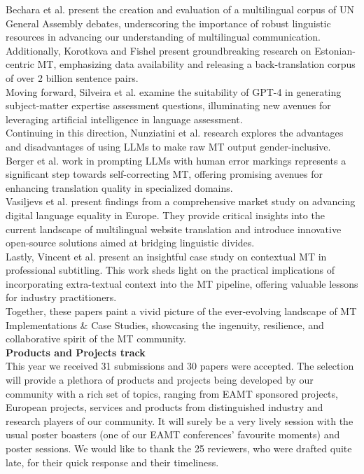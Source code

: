 Bechara et al. present the creation and evaluation of a multilingual corpus of UN General Assembly debates, underscoring the importance of robust linguistic resources in advancing our understanding of multilingual communication.
\\

Additionally, Korotkova and Fishel present groundbreaking research on Estonian-centric MT, emphasizing data availability and releasing a back-translation corpus of over 2 billion sentence pairs.
\\

Moving forward, Silveira et al. examine the suitability of GPT-4 in generating subject-matter expertise assessment questions, illuminating new avenues for leveraging artificial intelligence in language assessment.
\\

Continuing in this direction, Nunziatini et al. research explores the advantages and disadvantages of using LLMs to make raw MT output gender-inclusive.
\\

Berger et al. work in prompting LLMs with human error markings represents a significant step towards self-correcting MT, offering promising avenues for enhancing translation quality in specialized domains.
\\

Vasiļjevs et al. present findings from a comprehensive market study on advancing digital language equality in Europe. They provide critical insights into the current landscape of multilingual website translation and introduce innovative open-source solutions aimed at bridging linguistic divides.
\\

Lastly, Vincent et al. present an insightful case study on contextual MT in professional subtitling. This work sheds light on the practical implications of incorporating extra-textual context into the MT pipeline, offering valuable lessons for industry practitioners.
\\

Together, these papers paint a vivid picture of the ever-evolving landscape of MT Implementations \& Case Studies, showcasing the ingenuity, resilience, and collaborative spirit of the MT community.
\\

{\bf Products and Projects track} 
\\

This year we received 31 submissions and 30 papers were accepted. The selection will provide a plethora of products and projects being developed by our community with a rich set of topics, ranging from EAMT sponsored projects, European projects, services and products from distinguished industry and research players of our community. It will surely be a very lively session with the usual poster boasters (one of our EAMT conferences’ favourite moments) and poster sessions. We would like to thank the 25 reviewers, who were drafted quite late, for their quick response and their timeliness.

